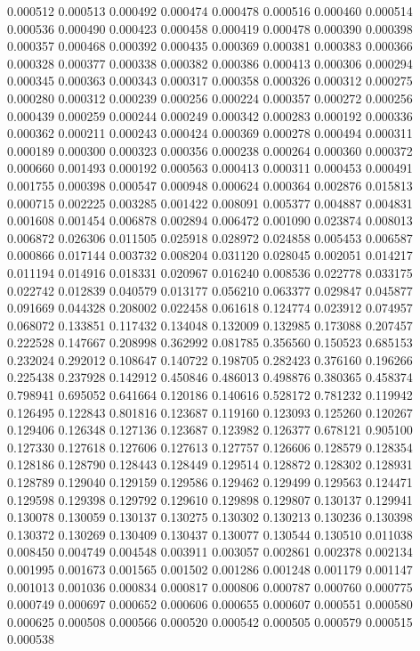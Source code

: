 0.000512
0.000513
0.000492
0.000474
0.000478
0.000516
0.000460
0.000514
0.000536
0.000490
0.000423
0.000458
0.000419
0.000478
0.000390
0.000398
0.000357
0.000468
0.000392
0.000435
0.000369
0.000381
0.000383
0.000366
0.000328
0.000377
0.000338
0.000382
0.000386
0.000413
0.000306
0.000294
0.000345
0.000363
0.000343
0.000317
0.000358
0.000326
0.000312
0.000275
0.000280
0.000312
0.000239
0.000256
0.000224
0.000357
0.000272
0.000256
0.000439
0.000259
0.000244
0.000249
0.000342
0.000283
0.000192
0.000336
0.000362
0.000211
0.000243
0.000424
0.000369
0.000278
0.000494
0.000311
0.000189
0.000300
0.000323
0.000356
0.000238
0.000264
0.000360
0.000372
0.000660
0.001493
0.000192
0.000563
0.000413
0.000311
0.000453
0.000491
0.001755
0.000398
0.000547
0.000948
0.000624
0.000364
0.002876
0.015813
0.000715
0.002225
0.003285
0.001422
0.008091
0.005377
0.004887
0.004831
0.001608
0.001454
0.006878
0.002894
0.006472
0.001090
0.023874
0.008013
0.006872
0.026306
0.011505
0.025918
0.028972
0.024858
0.005453
0.006587
0.000866
0.017144
0.003732
0.008204
0.031120
0.028045
0.002051
0.014217
0.011194
0.014916
0.018331
0.020967
0.016240
0.008536
0.022778
0.033175
0.022742
0.012839
0.040579
0.013177
0.056210
0.063377
0.029847
0.045877
0.091669
0.044328
0.208002
0.022458
0.061618
0.124774
0.023912
0.074957
0.068072
0.133851
0.117432
0.134048
0.132009
0.132985
0.173088
0.207457
0.222528
0.147667
0.208998
0.362992
0.081785
0.356560
0.150523
0.685153
0.232024
0.292012
0.108647
0.140722
0.198705
0.282423
0.376160
0.196266
0.225438
0.237928
0.142912
0.450846
0.486013
0.498876
0.380365
0.458374
0.798941
0.695052
0.641664
0.120186
0.140616
0.528172
0.781232
0.119942
0.126495
0.122843
0.801816
0.123687
0.119160
0.123093
0.125260
0.120267
0.129406
0.126348
0.127136
0.123687
0.123982
0.126377
0.678121
0.905100
0.127330
0.127618
0.127606
0.127613
0.127757
0.126606
0.128579
0.128354
0.128186
0.128790
0.128443
0.128449
0.129514
0.128872
0.128302
0.128931
0.128789
0.129040
0.129159
0.129586
0.129462
0.129499
0.129563
0.124471
0.129598
0.129398
0.129792
0.129610
0.129898
0.129807
0.130137
0.129941
0.130078
0.130059
0.130137
0.130275
0.130302
0.130213
0.130236
0.130398
0.130372
0.130269
0.130409
0.130437
0.130077
0.130544
0.130510
0.011038
0.008450
0.004749
0.004548
0.003911
0.003057
0.002861
0.002378
0.002134
0.001995
0.001673
0.001565
0.001502
0.001286
0.001248
0.001179
0.001147
0.001013
0.001036
0.000834
0.000817
0.000806
0.000787
0.000760
0.000775
0.000749
0.000697
0.000652
0.000606
0.000655
0.000607
0.000551
0.000580
0.000625
0.000508
0.000566
0.000520
0.000542
0.000505
0.000579
0.000515
0.000538
